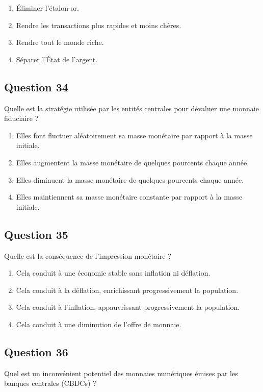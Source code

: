 \documentclass[12pt,a4paper]{article}
\begin{document}
\begin{enumerate}[label=\Alph*., leftmargin=*]
\item Éliminer l'étalon-or.
\item Rendre les transactions plus rapides et moins chères.
\item Rendre tout le monde riche.
\item Séparer l'État de l'argent.
\end{enumerate}

\bigskip


\subsection*{Question 34}
Quelle est la stratégie utilisée par les entités centrales pour dévaluer une monnaie fiduciaire ?

\begin{enumerate}[label=\Alph*., leftmargin=*]
\item Elles font fluctuer aléatoirement sa masse monétaire par rapport à la masse initiale.
\item Elles augmentent la masse monétaire de quelques pourcents chaque année.
\item Elles diminuent la masse monétaire de quelques pourcents chaque année.
\item Elles maintiennent sa masse monétaire constante par rapport à la masse initiale.
\end{enumerate}

\bigskip


\subsection*{Question 35}
Quelle est la conséquence de l'impression monétaire ?

\begin{enumerate}[label=\Alph*., leftmargin=*]
\item Cela conduit à une économie stable sans inflation ni déflation.
\item Cela conduit à la déflation, enrichissant progressivement la population.
\item Cela conduit à l'inflation, appauvrissant progressivement la population.
\item Cela conduit à une diminution de l'offre de monnaie.
\end{enumerate}

\bigskip


\subsection*{Question 36}
Quel est un inconvénient potentiel des monnaies numériques émises par les banques centrales (CBDCs) ?
\end{document}
